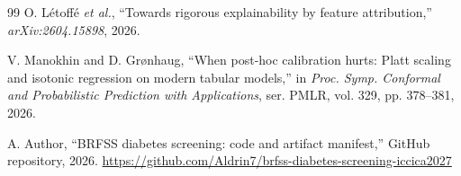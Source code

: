 \documentclass[conference]{IEEEtran}
\begin{document}
\begin{thebibliography}{99}
O. L\'etoff\'e \textit{et al.}, ``Towards rigorous explainability by feature attribution,'' \textit{arXiv:2604.15898}, 2026.

V. Manokhin and D. Gr{\o}nhaug, ``When post-hoc calibration hurts: Platt scaling and isotonic regression on modern tabular models,'' in \textit{Proc. Symp. Conformal and Probabilistic Prediction with Applications}, ser. PMLR, vol. 329, pp. 378--381, 2026.


A. Author, ``BRFSS diabetes screening: code and artifact manifest,'' GitHub repository, 2026. \url{https://github.com/Aldrin7/brfss-diabetes-screening-iccica2027}

\end{thebibliography}
\end{document}
